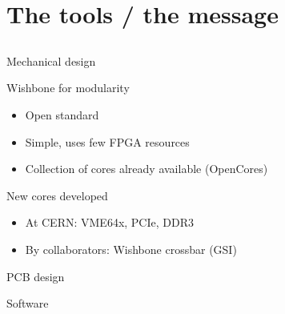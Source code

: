 \documentclass[compress,red]{beamer}
\begin{document}
\section{The tools / the message}

\subsection*{} %

\begin{frame}{Mechanical design}

  \begin{block}{Wishbone for modularity}
    \begin{itemize}
    \item Open standard
    \item Simple, uses few FPGA resources
    \item Collection of cores already available (OpenCores)
    \end{itemize}
  \end{block}

  \begin{block}{New cores developed}
    \begin{itemize}
    \item At CERN: VME64x, PCIe, DDR3
    \item By collaborators: Wishbone crossbar (GSI)
    \end{itemize}
  \end{block}

  \note[item]{}

\end{frame}

\begin{frame}{PCB design}

  \begin{center}
  \end{center}

  \note[item]{}

\end{frame}

\begin{frame}{Software}

  \begin{center}
  \end{center}

  \note[item]{}

\end{frame}
\end{document}
